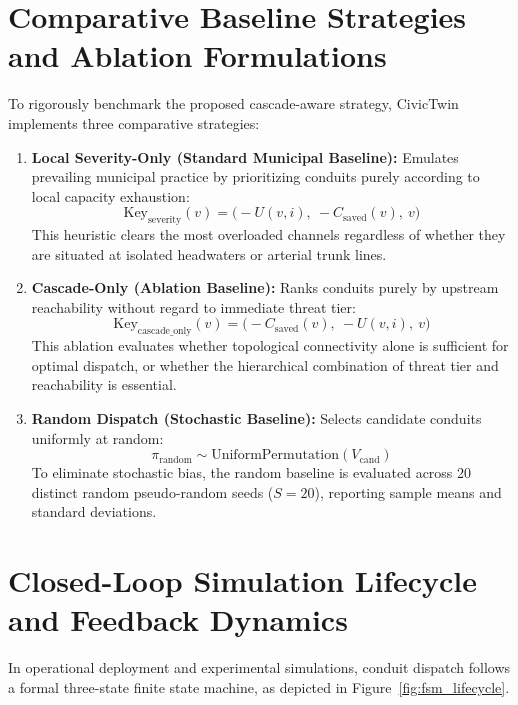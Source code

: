 \section{Comparative Baseline Strategies and Ablation Formulations}
To rigorously benchmark the proposed cascade-aware strategy, CivicTwin implements three comparative strategies:
\begin{enumerate}
    \item \textbf{Local Severity-Only (Standard Municipal Baseline):}
    Emulates prevailing municipal practice by prioritizing conduits purely according to local capacity exhaustion:
    \begin{equation}
    \text{Key}_{\text{severity}}(v) = \Big(-U(v, i),~ -C_{\text{saved}}(v),~ v\Big)
    \label{eqn:severity_sort_key}
    \end{equation}
    This heuristic clears the most overloaded channels regardless of whether they are situated at isolated headwaters or arterial trunk lines.
    \item \textbf{Cascade-Only (Ablation Baseline):}
    Ranks conduits purely by upstream reachability without regard to immediate threat tier:
    \begin{equation}
    \text{Key}_{\text{cascade\_only}}(v) = \Big(-C_{\text{saved}}(v),~ -U(v, i),~ v\Big)
    \label{eqn:cascade_only_key}
    \end{equation}
    This ablation evaluates whether topological connectivity alone is sufficient for optimal dispatch, or whether the hierarchical combination of threat tier and reachability is essential.
    \item \textbf{Random Dispatch (Stochastic Baseline):}
    Selects candidate conduits uniformly at random:
    \begin{equation}
    \pi_{\text{random}} \sim \text{UniformPermutation}(V_{\text{cand}})
    \end{equation}
    To eliminate stochastic bias, the random baseline is evaluated across 20 distinct random pseudo-random seeds ($S = 20$), reporting sample means and standard deviations.
\end{enumerate}

\section{Closed-Loop Simulation Lifecycle and Feedback Dynamics}
In operational deployment and experimental simulations, conduit dispatch follows a formal three-state finite state machine, as depicted in Figure~\ref{fig:fsm_lifecycle}.

